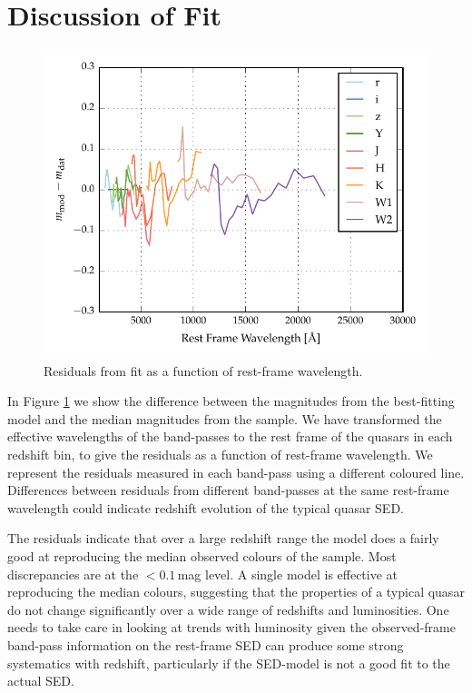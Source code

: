 \section{Discussion of Fit}

\begin{figure}
  \centering
  \includegraphics[width=\textwidth]{figures/chapter05/model_residuals.pdf}
  \caption[{Residuals from fit as a function of rest-frame wavelength.}]{Residuals from fit as a function of rest-frame wavelength. }
  \label{fig:residuals}
\end{figure}

In Figure \ref{fig:residuals} we show the difference between the magnitudes from the best-fitting model and the median magnitudes from the sample. 
We have transformed the effective wavelengths of the band-passes to the rest frame of the quasars in each redshift bin, to give the residuals as a function of rest-frame wavelength. 
We represent the residuals measured in each band-pass using a different coloured line. 
Differences between residuals from different band-passes at the same rest-frame wavelength could indicate redshift evolution of the typical quasar SED. 

The residuals indicate that over a large redshift range the model does a fairly good at reproducing the median observed colours of the sample. 
Most discrepancies are at the $<0.1$\,mag level. 
A single model is effective at reproducing the median colours, suggesting that the properties of a typical quasar do not change significantly over a wide range of redshifts and luminosities. 
One needs to take care in looking at trends with luminosity given the observed-frame band-pass information on the rest-frame SED can produce some strong systematics with redshift, particularly if the SED-model is not a good fit to the actual SED.

